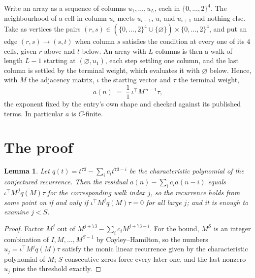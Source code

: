 \documentclass[11pt,a4paper]{article}
\theoremstyle{plain}
\newtheorem{lemma}[theorem]{Lemma}
\theoremstyle{definition}
\begin{document}
Write an array as a sequence of columns $u_1,\dots,u_L$, each in
$\{0,\dots,2\}^{4}$. The neighbourhood of a cell in column $u_i$ meets $u_{i-1}$,
$u_i$ and $u_{i+1}$ and nothing else. Take as vertices the pairs
$(r,s)\in(\{0,\dots,2\}^{4}\cup\{\varnothing\})\times\{0,\dots,2\}^{4}$,
and put an edge $(r,s)\to(s,t)$ when column $s$ satisfies the condition at every one of its
$4$ cells, given $r$ above and $t$ below. An array with $L$ columns is then a walk of length
$L-1$ starting at $(\varnothing,u_1)$, each step settling one column, and the last column is
settled by the terminal weight, which evaluates it with $\varnothing$ below. Hence,
with $M$ the adjacency matrix, $\iota$ the starting vector and $\tau$ the terminal weight,
\[
a(n)\;=\;\frac{1}{1}\,\iota^{\!\top}M^{\,n-1}\tau ,
\]
the exponent fixed by the entry's own shape and checked against its published terms. In
particular $a$ is $C$-finite.

\section{The proof}

\begin{lemma}\label{lem:crit}
Let $q(t)=t^{73}-\sum_i c_it^{73-i}$ be the characteristic polynomial of the
conjectured recurrence. Then the residual $a(n)-\sum_ic_ia(n-i)$ equals
$\iota^{\!\top}M^{\,j}q(M)\tau$ for the corresponding walk index $j$, so the
recurrence holds from some point on if and only if $\iota^{\!\top}M^{j}q(M)\tau=0$ for all
large $j$; and it is enough to examine $j<S$.
\end{lemma}

\begin{proof}
Factor $M^{j}$ out of $M^{j+73}-\sum_ic_iM^{j+73-i}$. For the bound, $M^{S}$
is an integer combination of $I,M,\dots,M^{S-1}$ by Cayley--Hamilton, so the numbers
$u_j=\iota^{\!\top}M^{j}q(M)\tau$ satisfy the monic linear recurrence given by the
characteristic polynomial of $M$; $S$ consecutive zeros force every later one, and the last
nonzero $u_j$ pins the threshold exactly.
\end{proof}
\end{document}
